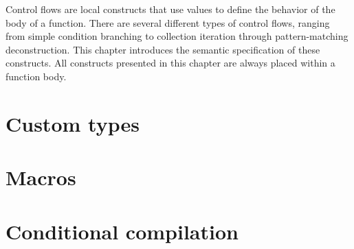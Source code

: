 \documentclass[a4paper,11pt]{book}
\begin{document}
Control flows are local constructs that use values to define the behavior of the
body of a function. There are several different types of control flows, ranging
from simple condition branching to collection iteration through pattern-matching
deconstruction. This chapter introduces the semantic specification of these
constructs. All constructs presented in this chapter are always placed within a
function body.

\begin{multicols*}{2}
  \minitoc%
  
\end{multicols*}

\chapter{Custom types}%
\label{chap:custom_types}

\begin{multicols*}{2}
  \minitoc%
  
\end{multicols*}

\chapter{Macros}
\label{chap:macros}

\begin{multicols*}{2}
  \minitoc%
\end{multicols*}


\chapter{Conditional compilation}
\label{chap:conditional_compilation}

\begin{multicols*}{2}
  \minitoc%
\end{multicols*}
\end{document}
